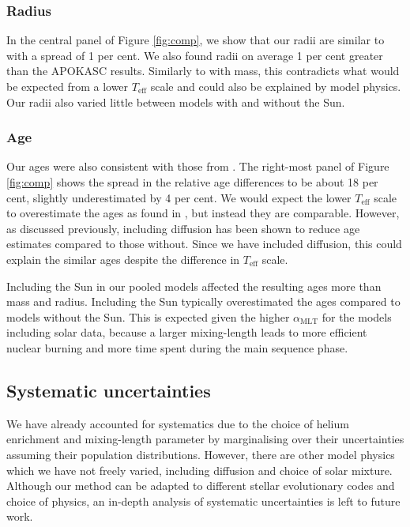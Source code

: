 \documentclass[a4paper,fleqn,usenatbib]{mnras}
\newcommand{\teff}{\ensuremath{T_\mathrm{eff}}}
\newcommand{\mlt}{\ensuremath{{\alpha_\mathrm{MLT}}}}
\begin{document}
\subsubsection{Radius}

In the central panel of Figure \ref{fig:comp}, we show that our radii are similar to  with a spread of 1 per cent. We also found radii on average 1 per cent greater than the APOKASC results. Similarly to with mass, this contradicts what would be expected from a lower $\teff$ scale and could also be explained by model physics. Our radii also varied little between models with and without the Sun.

\subsubsection{Age}

Our ages were also consistent with those from . The right-most panel of Figure \ref{fig:comp} shows the spread in the relative age differences to be about 18 per cent, slightly underestimated by 4 per cent. We would expect the lower $\teff$ scale to overestimate the ages as found in , but instead they are comparable. However, as discussed previously, including diffusion has been shown to reduce age estimates compared to those without. Since we have included diffusion, this could explain the similar ages despite the difference in $\teff$ scale.

Including the Sun in our pooled models affected the resulting ages more than mass and radius. Including the Sun typically overestimated the ages compared to models without the Sun. This is expected given the higher $\mlt$ for the models including solar data, because a larger mixing-length leads to more efficient nuclear burning and more time spent during the main sequence phase. 

\subsection{Systematic uncertainties}\label{sec:sys}

We have already accounted for systematics due to the choice of helium enrichment and mixing-length parameter by marginalising over their uncertainties assuming their population distributions. However, there are other model physics which we have not freely varied, including diffusion and choice of solar mixture. Although our method can be adapted to different stellar evolutionary codes and choice of physics, an in-depth analysis of systematic uncertainties is left to future work. 
\end{document}
